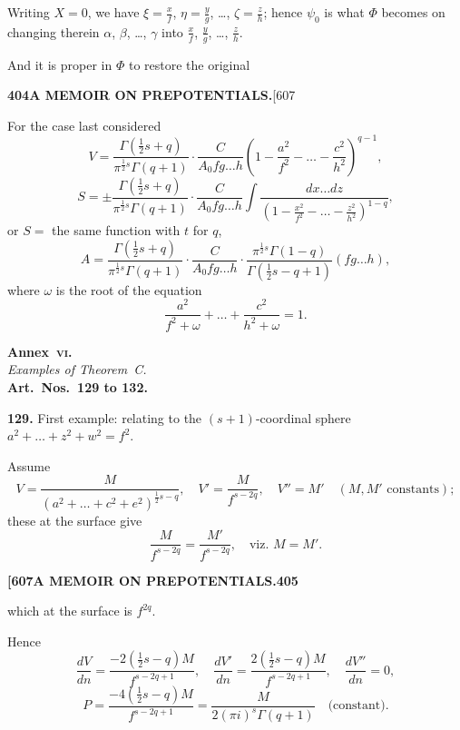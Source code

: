 \documentclass[11pt,a4paper]{book}
\begin{document}
{Writing $X = 0$, we have $\xi = \frac{x}{f}$, $\eta = \frac{y}{g}$, \ldots, $\zeta = \frac{z}{h}$; hence $\psi_0$ is what $\Phi$ becomes on changing therein $\alpha$, $\beta$, \ldots, $\gamma$ into $\frac{x}{f}$, $\frac{y}{g}$, \ldots, $\frac{z}{h}$.

And it is proper in $\Phi$ to restore the original

\newpage
\noindent\textbf{404}\hspace{\fill}\textbf{A MEMOIR ON PREPOTENTIALS.}\hspace{\fill}[607

For the case last considered
\[
V = \frac{\Gamma(\frac{1}{2}s+q)}{\pi^{\frac{1}{2}s}\Gamma(q+1)} \cdot \frac{C}{A_0 fg\ldots h} \left(1 - \frac{a^2}{f^2} - \ldots - \frac{c^2}{h^2}\right)^{q-1},
\]
\[
S = \pm \frac{\Gamma(\frac{1}{2}s+q)}{\pi^{\frac{1}{2}s}\Gamma(q+1)} \cdot \frac{C}{A_0 fg\ldots h} \int \frac{dx\ldots dz}{(1-\frac{x^2}{f^2}-\ldots-\frac{z^2}{h^2})^{1-q}},
\]
or $S = $ the same function with $t$ for $q$,
\[
A = \frac{\Gamma(\frac{1}{2}s+q)}{\pi^{\frac{1}{2}s}\Gamma(q+1)} \cdot \frac{C}{A_0 fg\ldots h} \cdot \frac{\pi^{\frac{1}{2}s}\Gamma(1-q)}{\Gamma(\frac{1}{2}s-q+1)} (fg\ldots h),
\]
where $\omega$ is the root of the equation
\[
\frac{a^2}{f^2+\omega} + \ldots + \frac{c^2}{h^2+\omega} = 1.
\]

\bigskip
\noindent\textbf{Annex~\textsc{vi.}}\\
\textit{Examples of Theorem~C.}\\
\textbf{Art.~Nos.~129 to 132.}

\medskip
\noindent\textbf{129.}
First example: relating to the $(s+1)$-coordinal sphere $a^2 + \ldots + z^2 + w^2 = f^2$.

Assume
\[
V = \frac{M}{(a^2 + \ldots + c^2 + e^2)^{\frac{1}{2}s-q}},\quad V' = \frac{M}{f^{s-2q}},\quad V'' = M' \quad (M, M' \text{ constants});
\]
these at the surface give
\[
\frac{M}{f^{s-2q}} = \frac{M'}{f^{s-2q}},\quad \text{viz. } M = M'.
\]

\newpage
\noindent\textbf{[607}\hspace{\fill}\textbf{A MEMOIR ON PREPOTENTIALS.}\hspace{\fill}\textbf{405}

which at the surface is $f^{2q}$.

Hence
\[
\frac{dV}{dn} = \frac{-2(\frac{1}{2}s-q)M}{f^{s-2q+1}},\quad \frac{dV'}{dn} = \frac{2(\frac{1}{2}s-q)M}{f^{s-2q+1}},\quad \frac{dV''}{dn} = 0,
\]
\[
P = \frac{-4(\frac{1}{2}s-q)M}{f^{s-2q+1}} = \frac{M}{2(\pi i)^s \Gamma(q+1)} \quad \text{(constant)}.
\]

}
\end{document}
